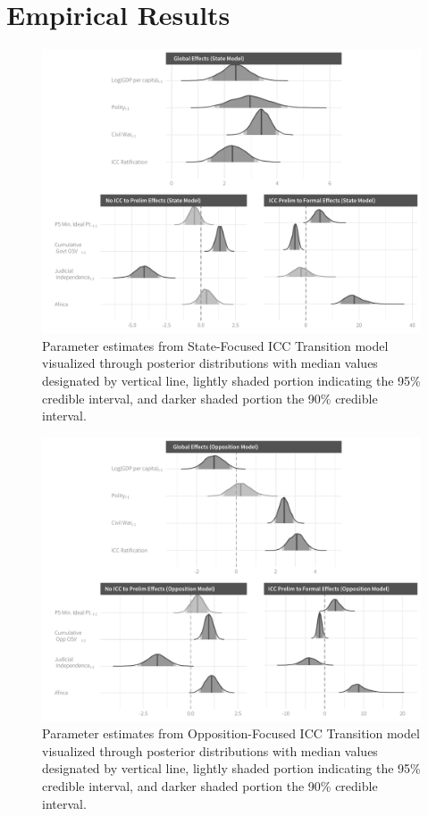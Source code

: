 \section*{Empirical Results}

\begin{figure}
    \centering
    \includegraphics[width=1\textwidth]{stateCoefSumm.pdf}
    \caption{Parameter estimates from State-Focused ICC Transition model visualized through posterior distributions with median values designated by vertical line, lightly shaded portion indicating the 95\% credible interval, and darker shaded portion the 90\% credible interval.}
    \label{fig:stateModel}
\end{figure}

\begin{figure}
    \centering
    \includegraphics[width=1\textwidth]{rebelCoefSumm.pdf}
    \caption{Parameter estimates from Opposition-Focused ICC Transition model visualized through posterior distributions with median values designated by vertical line, lightly shaded portion indicating the 95\% credible interval, and darker shaded portion the 90\% credible interval.}
    \label{fig:rebelModel}
\end{figure}

